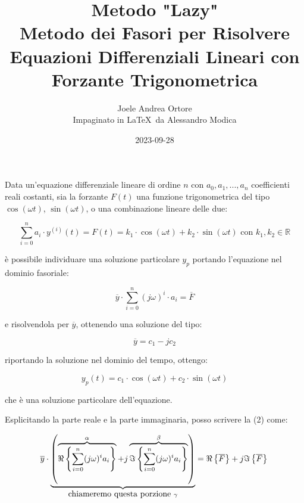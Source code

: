 \documentclass[11pt,italian]{article}
\title{Metodo "Lazy"\\ \large Metodo dei Fasori per Risolvere Equazioni Differenziali Lineari con Forzante Trigonometrica}
\author{Joele Andrea Ortore\\ \small Impaginato in \LaTeX\ da Alessandro Modica}
\date{2023-09-28}
\theoremstyle{remark}
\begin{document}
\maketitle

Data un'equazione differenziale lineare di ordine \(n\) con \(a_0, a_1, ..., a_n\) coefficienti reali costanti, sia la forzante \(F(t)\) una funzione trigonometrica del tipo \(\cos (\omega t)\), \(\sin (\omega t)\), o una combinazione lineare delle due:

\begin{equation}
    \sum_{i=0}^{n} a_i \cdot y^{(i)}(t) = F(t) = k_1 \cdot \cos (\omega t) + k_2 \cdot \sin (\omega t) \mbox{ con } k_1, k_2 \in \mathbb{R}
\end{equation}

è possibile individuare una soluzione particolare \(y_p\) portando l'equazione nel dominio fasoriale:

\begin{equation}
    \overline{y} \cdot \sum_{i=0}^{n} (j \omega)^i \cdot a_i = \overline{F}
\end{equation}

e risolvendola per \(\overline{y}\), ottenendo una soluzione del tipo:

\begin{equation*}
    \overline{y} = c_1 - j c_2
\end{equation*}

riportando la soluzione nel dominio del tempo, ottengo:

\begin{equation*}
    y_p(t) = c_1 \cdot \cos (\omega t) + c_2 \cdot \sin (\omega t)
\end{equation*}

che è una soluzione particolare dell'equazione.

Esplicitando la parte reale e la parte immaginaria, posso scrivere la (2) come:

\begin{equation*}
    \overline{y} \cdot \underbrace{ \left( \overbrace{\Re\left\{\sum_{i=0}^n (j \omega)^i a_i \right\}}^{\alpha} + j \overbrace{\Im\left\{\sum_{i=0}^n (j \omega)^i a_i \right\}}^{\beta} \right)}_{\mbox{chiameremo questa porzione } \gamma} = \Re\left\{\overline{F}\right\} + j \Im\left\{\overline{F}\right\}                                                                                                                                   \\
\end{equation*}
\end{document}
